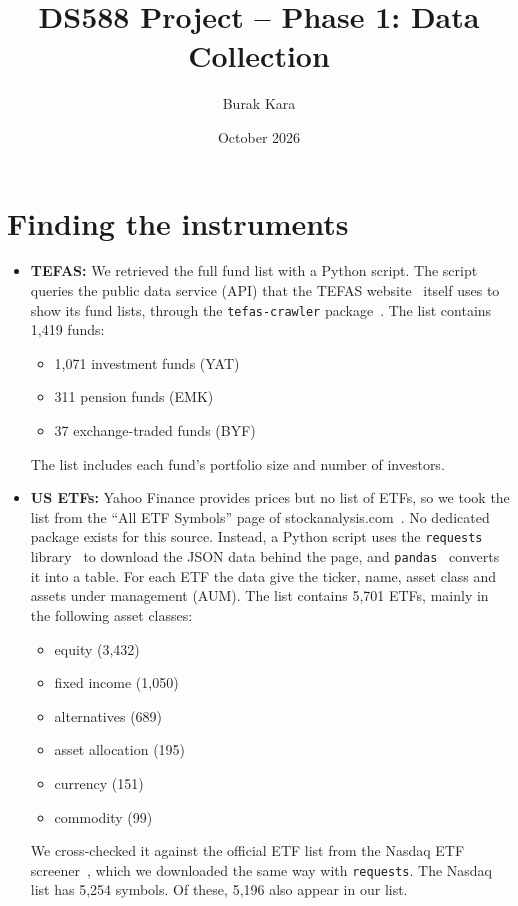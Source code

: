 \documentclass[11pt,a4paper]{article}
\title{DS588 Project -- Phase 1: Data Collection}
\author{Burak Kara}
\date{October 2026}
\begin{document}
\maketitle
\section{Finding the instruments}
\begin{itemize}
  \item \textbf{TEFAS:} We retrieved the full fund list with a Python script. The script
        queries the public data service (API) that the TEFAS website~\cite{tefas} itself
        uses to show its fund lists, through the \texttt{tefas-crawler}
        package~\cite{tefascrawler}. The list contains 1{,}419 funds:
        \begin{itemize}
          \item 1{,}071 investment funds (YAT)
          \item 311 pension funds (EMK)
          \item 37 exchange-traded funds (BYF)
        \end{itemize}
        The list includes each fund's portfolio size and number of investors.
  \item \textbf{US ETFs:} Yahoo Finance provides prices but no list of ETFs, so we took
        the list from the ``All ETF Symbols'' page of stockanalysis.com~\cite{stockanalysis}.
        No dedicated package exists for this source. Instead, a Python script uses the
        \texttt{requests} library~\cite{requests} to download the JSON data behind the page,
        and \texttt{pandas}~\cite{pandas} converts it into a table. For each ETF the data give
        the ticker, name, asset class and assets under management (AUM). The list contains
        5{,}701 ETFs, mainly in the following asset classes:
        \begin{itemize}
          \item equity (3{,}432)
          \item fixed income (1{,}050)
          \item alternatives (689)
          \item asset allocation (195)
          \item currency (151)
          \item commodity (99)
        \end{itemize}
        We cross-checked it against the official ETF list from the Nasdaq ETF
        screener~\cite{nasdaq}, which we downloaded the same way with \texttt{requests}.
        The Nasdaq list has 5{,}254 symbols. Of these, 5{,}196 also appear in our list.
\end{itemize}
\end{document}
